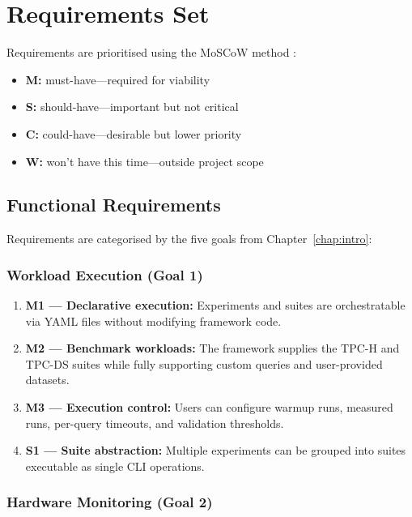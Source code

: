 \documentclass{l4proj}
\begin{document}
\section{Requirements Set}
\label{sec:requirements}

Requirements are prioritised using the MoSCoW method \citep{clegg2004case}:

\begin{itemize}
    \item \textbf{M:} must-have---required for viability
    \item \textbf{S:} should-have---important but not critical
    \item \textbf{C:} could-have---desirable but lower priority
    \item \textbf{W:} won't have this time---outside project scope
\end{itemize}

\subsection{Functional Requirements}
\label{sec:functional_reqs}

Requirements are categorised by the five goals from Chapter~\ref{chap:intro}:

\subsubsection{Workload Execution (Goal 1)}
\label{sec:req_workload}

\begin{enumerate}
    \item \textbf{M1 --- Declarative execution:} Experiments and suites are orchestratable via YAML files without modifying framework code.
    \item \textbf{M2 --- Benchmark workloads:} The framework supplies the TPC-H and TPC-DS suites while fully supporting custom queries and user-provided datasets.
    \item \textbf{M3 --- Execution control:} Users can configure warmup runs, measured runs, per-query timeouts, and validation thresholds.
    \item \textbf{S1 --- Suite abstraction:} Multiple experiments can be grouped into suites executable as single CLI operations.
\end{enumerate}

\subsubsection{Hardware Monitoring (Goal 2)}
\label{sec:req_monitoring}
\end{document}
